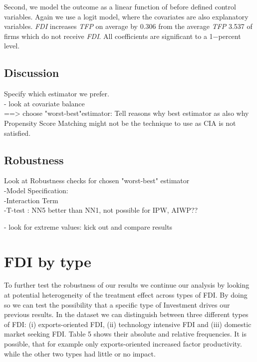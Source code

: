 \documentclass[a4paper,12pt]{scrartcl}
\begin{document}
Second, we model the outcome as a linear function of before defined control variables. Again we use a logit model, where the covariates are also explanatory variables. \textit{FDI} increases \textit{TFP} on average by 0.306 from the average  \textit{TFP} 3.537 of firms which do not receive \textit{FDI}. All coefficients are significant to a 1$-$percent level.

\newpage
\subsection{Discussion}
Specify which estimator we prefer.\\
- look at covariate balance \\
==> choose "worst-best"estimator: Tell reasons why best estimator as also why Propensity Score Matching might not be the technique to use as CIA is not satisfied. 

\subsection{Robustness}
Look at Robustness checks for chosen "worst-best" estimator \\
-Model Specification: \\
-Interaction Term\\
-T-test : NN5 better than NN1, not possible for IPW, AIWP??

- look for extreme values: kick out and compare results 
\section{FDI by type}

To further test the robustness of our results  we continue our analysis by looking at potential heterogeneity of the treatment effect across types of FDI. By doing so we can test the possibility that a specific type of Investment drives our previous results. In the dataset we can distinguish between three different types of FDI: (i) exports-oriented FDI, (ii) technology intensive FDI and (iii) domestic market seeking FDI. Table 5 shows their absolute and relative frequencies. It is possible, that for example only exports-oriented increased factor productivity. while the other two types had little or no impact.
\end{document}
